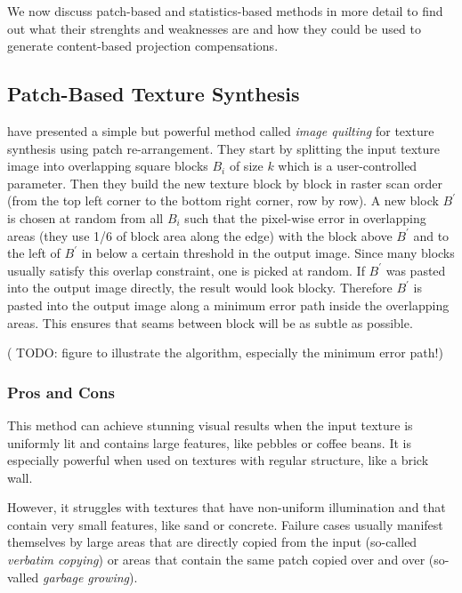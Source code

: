 We now discuss patch-based and statistics-based methods in more detail to find out what their strenghts and weaknesses are and how they could be used to generate content-based projection compensations.

\subsection{Patch-Based Texture Synthesis}
\label{section:background-texture_synthesis-patch_based}

\citet{Efros2001} have presented a simple but powerful method called \textit{image quilting} for texture synthesis using patch re-arrangement. They start by splitting the input texture image into overlapping square blocks \(B_i\) of size \(k\) which is a user-controlled parameter. Then they build the new texture block by block in raster scan order (from the top left corner to the bottom right corner, row by row). A new block \(B^{\prime}\) is chosen at random from all \(B_i\) such that the pixel-wise error in overlapping areas (they use 1/6 of block area along the edge) with the block above \(B^{\prime}\) and to the left of \(B^{\prime}\) in below a certain threshold in the output image. Since many blocks usually satisfy this overlap constraint, one is picked at random. If \(B^{\prime}\) was pasted into the output image directly, the result would look blocky. Therefore \(B^{\prime}\) is pasted into the output image along a minimum error path inside the overlapping areas. This ensures that seams between block will be as subtle as possible.

({\color{red} TODO: figure to illustrate the algorithm, especially the minimum error path!})

\subsubsection{Pros and Cons}
\label{section:background-texture_synthesis-patch_based-pros_and_cons}

This method can achieve stunning visual results when the input texture is uniformly lit and contains large features, like pebbles or coffee beans. It is especially powerful when used on textures with regular structure, like a brick wall.

However, it struggles with textures that have non-uniform illumination and that contain very small features, like sand or concrete. Failure cases usually manifest themselves by large areas that are directly copied from the input (so-called \textit{verbatim copying}) or areas that contain the same patch copied over and over (so-valled \textit{garbage growing}).

